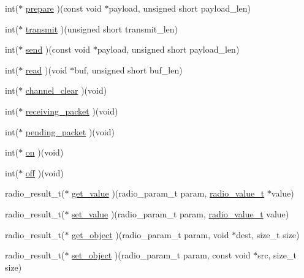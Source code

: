 \begin{DoxyCompactItemize}
\item 
int($\ast$ \hyperlink{structradio__driver_a917063e157b641491318c3811a41b564}{prepare} )(const void $\ast$payload, unsigned short payload\+\_\+len)
\item 
int($\ast$ \hyperlink{structradio__driver_a5e0e87a4384c32182b9047f4f65d24e1}{transmit} )(unsigned short transmit\+\_\+len)
\item 
int($\ast$ \hyperlink{structradio__driver_a30e7b635e51b106d36b8aae3a3ffd4d9}{send} )(const void $\ast$payload, unsigned short payload\+\_\+len)
\item 
int($\ast$ \hyperlink{structradio__driver_a838d67a29dd557b6c7669af2443109fe}{read} )(void $\ast$buf, unsigned short buf\+\_\+len)
\item 
int($\ast$ \hyperlink{structradio__driver_a7c8c8b833955461003d18b41ffc24e4c}{channel\+\_\+clear} )(void)
\item 
int($\ast$ \hyperlink{structradio__driver_a69caf76a3322491ff93e1d36ec0b5480}{receiving\+\_\+packet} )(void)
\item 
int($\ast$ \hyperlink{structradio__driver_a35fcb90c278a662e42d9cf5c767fded2}{pending\+\_\+packet} )(void)
\item 
int($\ast$ \hyperlink{structradio__driver_adbdd3a3ba35f7b3dc80ec80ffab44fe6}{on} )(void)
\item 
int($\ast$ \hyperlink{structradio__driver_a109dee491698150e7431e70ebd727a41}{off} )(void)
\item 
radio\+\_\+result\+\_\+t($\ast$ \hyperlink{structradio__driver_a825eba300cda915050282bfec75787bd}{get\+\_\+value} )(radio\+\_\+param\+\_\+t param, \hyperlink{group__radio_gad8766f1c2c2c55ac53079fe58750967a}{radio\+\_\+value\+\_\+t} $\ast$value)
\item 
radio\+\_\+result\+\_\+t($\ast$ \hyperlink{structradio__driver_af809fe7735fa3951f22c8ab54c1c4917}{set\+\_\+value} )(radio\+\_\+param\+\_\+t param, \hyperlink{group__radio_gad8766f1c2c2c55ac53079fe58750967a}{radio\+\_\+value\+\_\+t} value)
\item 
radio\+\_\+result\+\_\+t($\ast$ \hyperlink{structradio__driver_a74a0e490531928dd4195f0d962bd4681}{get\+\_\+object} )(radio\+\_\+param\+\_\+t param, void $\ast$dest, size\+\_\+t size)
\item 
radio\+\_\+result\+\_\+t($\ast$ \hyperlink{structradio__driver_a03992b1e627d7be6bd9cfaf98ee8c8f9}{set\+\_\+object} )(radio\+\_\+param\+\_\+t param, const void $\ast$src, size\+\_\+t size)
\end{DoxyCompactItemize}


